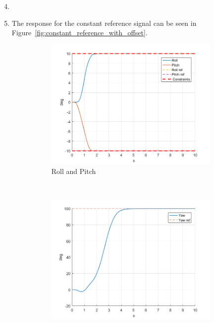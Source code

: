\documentclass[11pt]{article}
\begin{document}
\begin{enumerate}
    \setcounter{enumi}{3}
    \item

    \item The response for the constant reference signal can be seen in
    Figure~\ref{fig:constant_reference_with_offset}.
    \begin{figure}[ht]
        \centering
        \begin{subfigure}[c]{0.3\linewidth}
            \centering
            \includegraphics[width=\linewidth]{Plots_05_ReferenceTracking_Constant/01}
            \caption{Roll and Pitch}
        \end{subfigure}
        ~
        \begin{subfigure}[c]{0.3\linewidth}
            \centering
            \includegraphics[width=\linewidth]{Plots_05_ReferenceTracking_Constant/02}

\end{subfigure}
\end{figure}
\end{enumerate}
\end{document}
